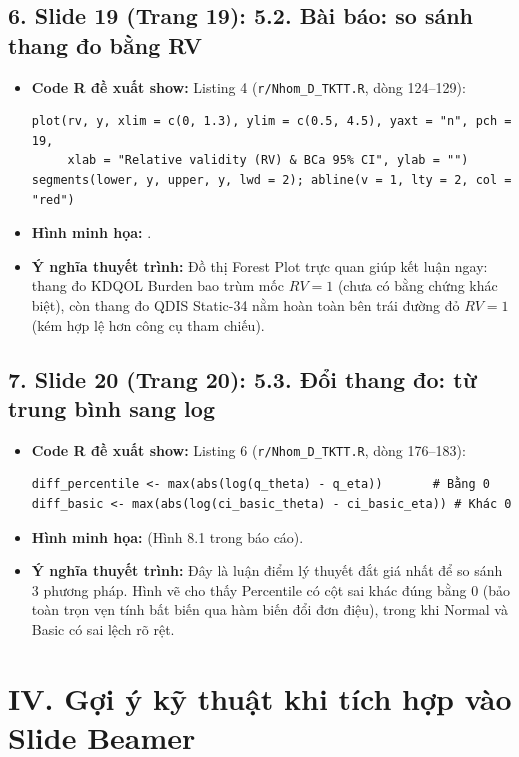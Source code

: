 \documentclass[10pt,a4paper]{article}
\begin{document}
\subsection*{6. Slide 19 (Trang 19): 5.2. Bài báo: so sánh thang đo bằng RV}
\begin{itemize}
    \item \textbf{Code R đề xuất show:} Listing 4 (\texttt{r/Nhom\_D\_TKTT.R}, dòng 124--129):
\begin{verbatim}
plot(rv, y, xlim = c(0, 1.3), ylim = c(0.5, 4.5), yaxt = "n", pch = 19,
     xlab = "Relative validity (RV) & BCa 95% CI", ylab = "")
segments(lower, y, upper, y, lwd = 2); abline(v = 1, lty = 2, col = "red")
\end{verbatim}
    \item \textbf{Hình minh họa:} .
    \item \textbf{Ý nghĩa thuyết trình:} Đồ thị Forest Plot trực quan giúp kết luận ngay: thang đo KDQOL Burden bao trùm mốc $RV=1$ (chưa có bằng chứng khác biệt), còn thang đo QDIS Static-34 nằm hoàn toàn bên trái đường đỏ $RV=1$ (kém hợp lệ hơn công cụ tham chiếu).
\end{itemize}

\subsection*{7. Slide 20 (Trang 20): 5.3. Đổi thang đo: từ trung bình sang log}
\begin{itemize}
    \item \textbf{Code R đề xuất show:} Listing 6 (\texttt{r/Nhom\_D\_TKTT.R}, dòng 176--183):
\begin{verbatim}
diff_percentile <- max(abs(log(q_theta) - q_eta))       # Bằng 0
diff_basic <- max(abs(log(ci_basic_theta) - ci_basic_eta)) # Khác 0
\end{verbatim}
    \item \textbf{Hình minh họa:}  (Hình 8.1 trong báo cáo).
    \item \textbf{Ý nghĩa thuyết trình:} Đây là luận điểm lý thuyết đắt giá nhất để so sánh 3 phương pháp. Hình vẽ cho thấy Percentile có cột sai khác đúng bằng 0 (bảo toàn trọn vẹn tính bất biến qua hàm biến đổi đơn điệu), trong khi Normal và Basic có sai lệch rõ rệt.
\end{itemize}

\vspace{0.3cm}

\section*{IV. Gợi ý kỹ thuật khi tích hợp vào Slide Beamer}
\end{document}
